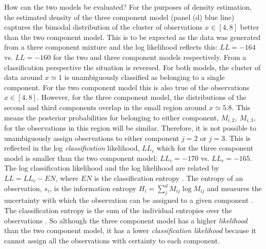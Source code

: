 How can the two models be evaluated?  For the purposes of density estimation, the estimated density of the three component model (panel (d) blue line) captures the bimodal distribution of the cluster of observations $x \in [4, 8]$ better than the two component model. This is to be expected as the data was generated from a three component mixture and the log likelihood reflects this: $LL=\num{-164}$ vs. $LL=\num{-160}$ for the two and three component models respectively. From a classification perspective the situation is reversed. For both models, the cluster of data around $x\simeq 1$ is unambiguously classified as belonging to a single component. For the two component model this is also true of the observations $x  \in [4, 8]$. However, for the three component model, the  distributions of the second and third components overlap in the small region around $x\simeq 5.8$. This means the posterior probabilities for belonging to either component, $M_{i, 2},\ M_{i, 3}$,  for the observations in this region will be similar. Therefore, it is not possible to unambiguously assign observations to either component $j=2$ or $j=3$. This is reflected in the log \emph{classification} likelihood, $LL_{c}$ which for the three component model is smaller than the two component model: $LL_{c}=\num{-170}$ vs. $LL_{c} = \num{-165}$. The log classification likelihood and the log likelihood are related by $LL = LL_{c} - EN$, where $EN$ is the classification entropy \cite{hathaway1986another}.  The entropy of an observation, $s_i$, is the information entropy  $H_i = \sum_{j}^{g}M_{ij}\log{M_{ij}}$  and measures the uncertainty with which the observation can be assigned to a given component \cite{mackay2003information}. The classification entropy is the sum of the individual entropies over the observations \cite{mclachlanFiniteMixtureModels2000}. So although the three component model has a higher \emph{likelihood} than the two component model, it has a lower \emph{classification likelihood} because it cannot assign all the observations with certainty to each component. 

